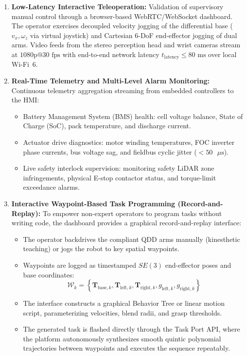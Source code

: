 \begin{enumerate}[leftmargin=1.5em]
  \item \textbf{Low-Latency Interactive Teleoperation:} Validation of supervisory manual control through a browser-based WebRTC/WebSocket dashboard. The operator exercises decoupled velocity jogging of the differential base ($v_x, \omega_z$ via virtual joystick) and Cartesian 6-DoF end-effector jogging of dual arms. Video feeds from the stereo perception head and wrist cameras stream at $1080\text{p} @ 30\text{ fps}$ with end-to-end network latency $t_{\text{latency}} \le 80\text{ ms}$ over local Wi-Fi~6.
  
  \item \textbf{Real-Time Telemetry and Multi-Level Alarm Monitoring:} Continuous telemetry aggregation streaming from embedded controllers to the HMI:
  \begin{itemize}
    \item Battery Management System (BMS) health: cell voltage balance, State of Charge (SoC), pack temperature, and discharge current.
    \item Actuator drive diagnostics: motor winding temperatures, FOC inverter phase currents, bus voltage sag, and fieldbus cyclic jitter ($<50\text{ }\mu\text{s}$).
    \item Live safety interlock supervision: monitoring safety LiDAR zone infringements, physical E-stop contactor status, and torque-limit exceedance alarms.
  \end{itemize}
  
  \item \textbf{Interactive Waypoint-Based Task Programming (Record-and-Replay):} To empower non-expert operators to program tasks without writing code, the dashboard provides a graphical record-and-replay interface:
  \begin{itemize}
    \item The operator backdrives the compliant QDD arms manually (kinesthetic teaching) or jogs the robot to key spatial waypoints.
    \item Waypoints are logged as timestamped $SE(3)$ end-effector poses and base coordinates:
    \begin{equation}
    \mathcal{W}_k = \left\{ \mathbf{T}_{\text{base}, k}, \mathbf{T}_{\text{left}, k}, \mathbf{T}_{\text{right}, k}, g_{\text{left}, k}, g_{\text{right}, k} \right\}
    \end{equation}
    \item The interface constructs a graphical Behavior Tree or linear motion script, parameterizing velocities, blend radii, and grasp thresholds.
    \item The generated task is flashed directly through the Task Port API, where the platform autonomously synthesizes smooth quintic polynomial trajectories between waypoints and executes the sequence repeatably.
  \end{itemize}


\end{enumerate}
